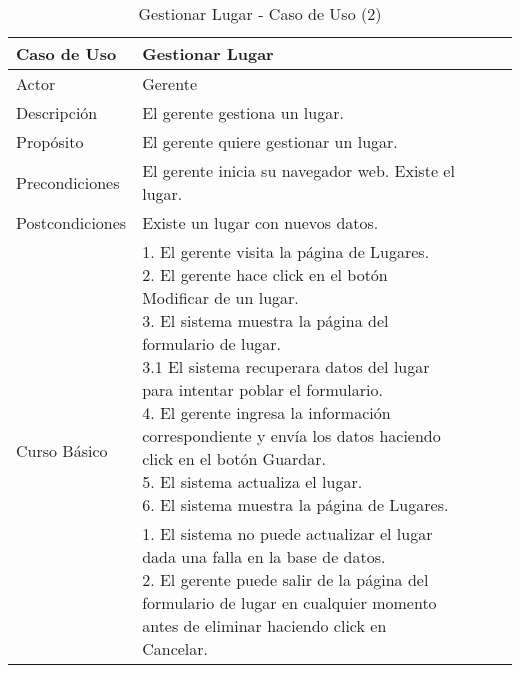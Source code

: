 \begin{table}[H]
    \begin{tabular}{@{} *5l @{}} \toprule
    \textbf{Caso de Uso} & Gestionar Lugar \\ \midrule
    Actor & Gerente \\ 
    Descripción & El gerente gestiona un lugar. \\ 
    Propósito & El gerente quiere gestionar un lugar. \\ \midrule
    Precondiciones & El gerente inicia su navegador web. Existe el lugar. \\ \midrule
    Postcondiciones & Existe un lugar con nuevos datos. \\ \midrule
    \multirow{4}{*}{Curso Básico}
        & \parbox{0.75\linewidth}{ 
                1. El gerente visita la página de Lugares. \\
                2. El gerente hace click en el botón Modificar de un lugar. \\
                3. El sistema muestra la página del formulario de lugar. \\
                    3.1 El sistema recuperara datos del lugar para intentar poblar el formulario. \\
                4. El gerente ingresa la información correspondiente y envía los datos haciendo click en el botón Guardar. \\
                5. El sistema actualiza el lugar.  \\
                6. El sistema muestra la página de Lugares.   
        } \\ \midrule
        & \parbox{0.75\linewidth}{ 
            1. El sistema no puede actualizar el lugar dada una falla en la base de datos. \\
            2. El gerente puede salir de la página del formulario de lugar en cualquier momento antes de eliminar haciendo click en Cancelar.
        }  \\  \bottomrule
     \hline
    \end{tabular}
        \caption{Gestionar Lugar - Caso de Uso (2)}
        \label{tab:tabcu-lugar2}
\end{table}


